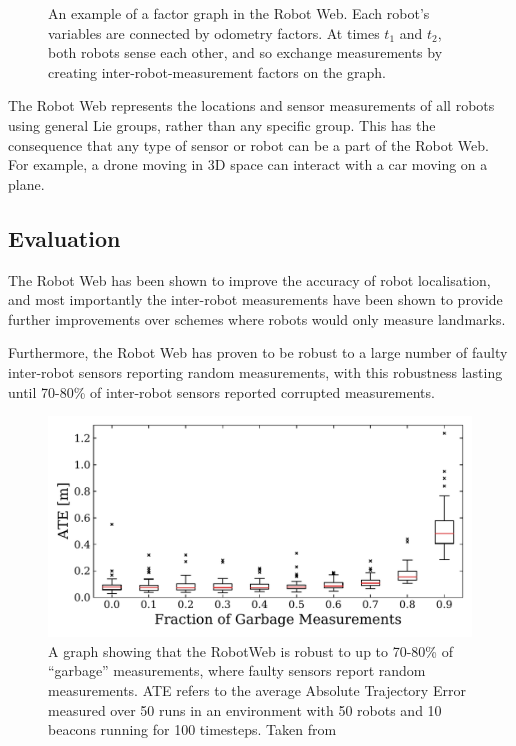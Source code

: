 \begin{figure}[!h]
    \centering
    

    \caption[Robot Web factor graph]{An example of a factor graph in the Robot Web. Each robot's variables are connected by odometry factors. At times $t_1$ and $t_2$, both robots sense each other, and so exchange measurements by creating inter-robot-measurement factors on the graph.}
\end{figure}

The Robot Web represents the locations and sensor measurements of all robots using general Lie groups, rather than any specific group. This has the consequence that any type of sensor or robot can be a part of the Robot Web. For example, a drone moving in 3D space can interact with a car moving on a plane.

\subsection{Evaluation}
The Robot Web has been shown to improve the accuracy of robot localisation, and most importantly the inter-robot measurements have been shown to provide further improvements over schemes where robots would only measure landmarks. %

Furthermore, the Robot Web has proven to be robust to a large number of faulty inter-robot sensors reporting random measurements, with this robustness lasting until 70-80\% of inter-robot sensors reported corrupted measurements.

\begin{figure}[!h]
    \centering
    \includegraphics[page=1,width=.60\textwidth]{diagrams/sensor_noise.pdf}
    \caption[RobotWeb's robustness to garbage measurements]{A graph showing that the RobotWeb is robust to up to 70-80\% of ``garbage'' measurements, where faulty sensors report random measurements. ATE refers to the average Absolute Trajectory Error measured over 50 runs in an environment with 50 robots and 10 beacons running for 100 timesteps. Taken from \cite[Figure~5]{Robotweb}}
\end{figure}

